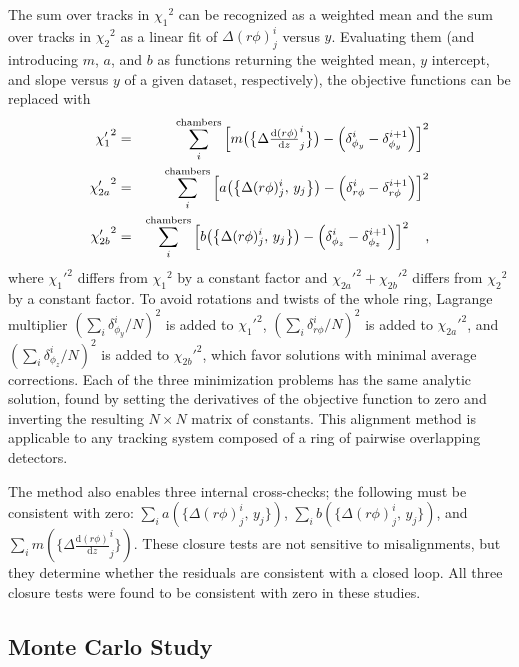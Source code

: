 The sum over tracks in ${\chi_1}^2$ can be recognized as a weighted
mean and the sum over tracks in ${\chi_2}^2$ as a linear fit of
$\Delta (r\phi)^i_j$ versus $y$.  Evaluating them (and introducing
$m$, $a$, and $b$ as functions returning the weighted mean, $y$
intercept, and slope versus $y$ of a given dataset, respectively), the objective functions can be replaced with
\begin{eqnarray}
{\chi_1'}^2 &=& \sum_i^{\mbox{\scriptsize chambers}}
\left[m\big(\big\{\Delta \tfrac{\textrm{d}(r\phi)}{\textrm{d}z}^i_j\big\}\big)
- \left(\delta_{\phi_y}^i - \delta_{\phi_y}^{i+1}\right)\right]^2 \\
{\chi_{2a}'}^2 &=& \sum_i^{\mbox{\scriptsize chambers}}
\left[a\big(\big\{\Delta (r\phi)^i_j, \, y_j\big\}\big) - \left(\delta_{r\phi}^i
- \delta_{r\phi}^{i+1}\right)\right]^2 \nonumber \\
{\chi_{2b}'}^2 &=& \sum_i^{\mbox{\scriptsize chambers}}
\left[b\big(\big\{\Delta (r\phi)^i_j, \, y_j\big\}\big) - \left(\delta_{\phi_z}^i - \delta_{\phi_z}^{i+1}\right)\right]^2\quad\mbox{,} \nonumber
\end{eqnarray}
where ${\chi_1'}^2$ differs from ${\chi_1}^2$ by a constant factor and
${\chi_{2a}'}^2 + {\chi_{2b}'}^2$ differs from ${\chi_2}^2$ by a
constant factor.  To avoid rotations and twists of the whole ring, Lagrange multiplier
$(\sum_i \delta_{\phi_y}^i/N)^2$ is added to ${\chi_1'}^2$,
$(\sum_i \delta_{r\phi}^i/N)^2$ is added to ${\chi_{2a}'}^2$, and
$(\sum_i \delta_{\phi_z}^i/N)^2$ is added to ${\chi_{2b}'}^2$,
which favor solutions with minimal average corrections.  Each
of the three minimization problems has the same analytic solution,
found by setting the derivatives of the objective function to zero and
inverting the resulting $N\times N$ matrix of constants.  This
alignment method is applicable to any tracking system composed of a
ring of pairwise overlapping detectors.

The method also enables three internal cross-checks; the following
must be consistent with zero: $\sum_i a(\{\Delta (r\phi)^i_j, \, y_j\})$, $\sum_i
b(\{\Delta (r\phi)^i_j, \, y_j\})$, and $\sum_i m(\{\Delta \frac{\textrm{d}(r\phi)}{\textrm{d}z}^i_j\})$.  These
closure tests are not sensitive to misalignments, but they determine
whether the residuals are consistent with a closed loop.  All three
closure tests were found to be consistent with zero in these studies.

\subsection{Monte Carlo Study}

